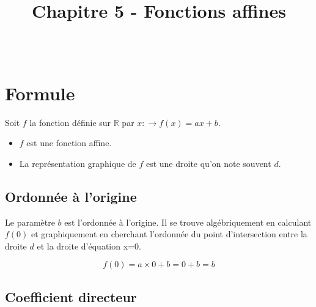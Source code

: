\documentclass[paper=a4, fontsize=9pt]{scrartcl} %
\title{
  \vspace{-10ex}
  \horrule{0.5pt} \\[0.4cm] %
  \huge Chapitre 5 - Fonctions affines\\ %
  \horrule{2pt} \\[0.5cm] %
}
\author{}
\date{\vspace{-10ex}} %
\begin{document}

\newtheorem{Definition}{Définition}
\newtheorem{Theorem}{Théorème}
\newtheorem{Proposition}{Propriété}

\renewcommand{\labelitemi}{$\bullet$}
\renewcommand{\labelitemii}{$\circ$}

\maketitle %
\setlength{\columnseprule}{1pt}

\section{Formule}

Soit $f$ la fonction définie sur $\mathbb{R}$ par $x : \to f(x) = ax + b$.\\

\begin{itemize}
\item $f$ est une fonction affine.
\item La représentation graphique de $f$ est une droite qu'on note souvent $d$.
\end{itemize}

\subsection{Ordonnée à l'origine}

Le paramètre $b$ est l'ordonnée à l'origine. Il se trouve algébriquement en calculant $f(0)$ et graphiquement en cherchant l'ordonnée du point d'intersection entre la droite $d$ et la droite d'équation x=0.

$$f(0) = a \times 0 + b = 0 + b = b$$


\subsection{Coefficient directeur}
\end{document}
